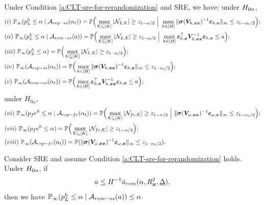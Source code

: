\documentclass[10pt,a4paper]{amsart}
\newcommand{\Lin}{\textnormal{L}}
\newcommand{\Prob}{\mathbb{P}}
\newcommand{\bs}{\boldsymbol}
\newcommand{\fe}{\textnormal{fe}}
\newcommand{\hpL}{p_\textnormal{L}^{\textnormal{h}}}
\newcommand{\hpfe}{p_\textnormal{fe}^{\textnormal{h}}}
\newcommand{\ma}{\mathcal{A}}
\newcommand{\mk}{\mathcal{K}}
\newcommand{\remss}{\textnormal{rem-ss}}
\newcommand{\rem}{\textnormal{rem}}
\newcommand{\repfe}{\textnormal{rep-fe}}
\newcommand{\repss}{\textnormal{rep-ss}}
\begin{document}
\begin{lemma}
\label{lem:asymptotic-limit-of-type-I-error-rate}
Under Condition \ref{a:CLT-sre-for-rerandomization} and SRE, we have: under $H_{0\textsc{n}}$,
    \begin{align*}
        &(i)~\Prob_{\infty}(\hpL \leq \alpha\mid \ma_{\repss}(\alpha_t))  =  \Prob\Big( \max_{\mk \subseteq [K]}|\mathcal{N}_{\Lin,\mk}| \geq z_{1-\alpha/2} ~\Big | ~ \max_{h \in [H]}\|\bs{\sigma}(\bs{V}_{h,\bs{x}\bs{x}})^{-1}\bs{\varepsilon}_{h,\bs{x}}\|_{\infty} \leq z_{1-\alpha_t/2} \Big); \\
         &(ii)~\Prob_{\infty}(\hpL \leq \alpha\mid \ma_{\remss}(a))  = \Prob\Big( \max_{\mk \subseteq [K]}|\mathcal{N}_{\Lin,\mk}| \geq z_{1-\alpha/2} ~\Big | ~ \max_{h\in [H]}\bs{\varepsilon}_{h,\bs{x}}^\top \bs{V}_{h,\bs{x}\bs{x}}^{-1} \bs{\varepsilon}_{h,\bs{x}} \leq a \Big);\\
         &(iii)~\Prob_{\infty}(\hpL \leq \alpha) = \Prob\Big( \max_{\mk \subseteq [K]}|\mathcal{N}_{\Lin,\mk}| \geq z_{1-\alpha/2} \Big);\quad \\
         & (iv) ~\Prob_{\infty}(\ma_{\repss}(\alpha_t)) = \Prob\Big(\max_{h \in [H]}\|\bs{\sigma}(\bs{V}_{h,\bs{x}\bs{x}})^{-1}\bs{\varepsilon}_{h,\bs{x}}\|_{\infty} \leq z_{1-\alpha_t/2}\Big);\\
         &(v)~ \Prob_{\infty}(\ma_{\remss}(\alpha_t)) = \Prob\Big(\max_{h\in [H]}\bs{\varepsilon}_{h,\bs{x}}^\top \bs{V}_{h,\bs{x}\bs{x}}^{-1} \bs{\varepsilon}_{h,\bs{x}} \leq a \Big);
    \end{align*}
    under $H_{0\omega}$,
    \begin{align*}
     &(vi)~\Prob_{\infty}(\hpfe \leq \alpha\mid \ma_{\repfe}(\alpha_t))  = \Prob\Big( \max_{\mk \subseteq [K]}|\mathcal{N}_{\fe ,\mk}| \geq z_{1-\alpha/2} ~ \Big | ~ \|\bs{\sigma}(\bs{V}_{\omega,\bs{x}\bs{x}})^{-1}\bs{\varepsilon}_{\omega,\bs{x}}\|_{\infty} \leq z_{1-\alpha_t/2} \Big);\\
      &(vii)~\Prob_{\infty}(\hpfe \leq \alpha)  = \Prob\Big( \max_{\mk \subseteq [K]}|\mathcal{N}_{\fe ,\mk}| \geq z_{1-\alpha/2}  \Big);\\
     &(viii)~ \Prob_{\infty}(\ma_{\repfe}(\alpha_t)) = \Prob( \|\bs{\sigma}(\bs{V}_{\omega,\bs{x}\bs{x}})^{-1}\bs{\varepsilon}_{\omega,\bs{x}}\|_{\infty} \leq z_{1-\alpha_t/2}).
    \end{align*}
\end{lemma}

\begin{lemma}
\label{lem:if-statement-for-rem-sre}
Consider SRE and assume Condition \ref{a:CLT-sre-for-rerandomization} holds. Under $H_{0\textsc{n}}$, if
    \begin{align*}
       a \leq  H^{-1}\bar{a}_{\rem}(\alpha, R^2_{\bs{x}}, \underline{\Delta}),
    \end{align*}
then we have $\Prob_{\infty}( \hpL \leq \alpha\mid \ma_{\remss}(a)) \leq \alpha.$
\end{lemma}
\end{document}
